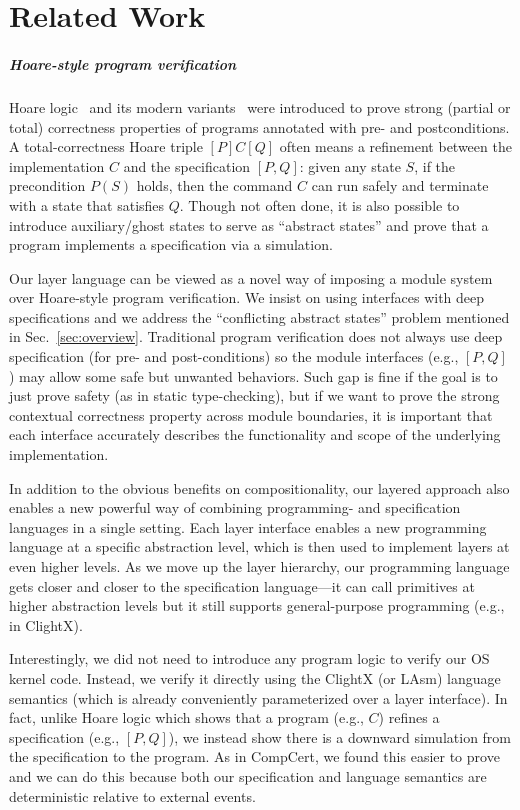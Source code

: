 
\chapter{Related Work}
\label{chap-rel}

\paragraph{Hoare-style program verification} Hoare logic~\cite{hoare69}
and its modern variants~\cite{reynolds02,boogie05,nanevski06} were
introduced to prove strong (partial or total) correctness properties
of programs annotated with pre- and postconditions. A
total-correctness Hoare triple $[P]C[Q]$ often means a refinement
between the implementation $C$ and the specification $[P,Q]$: given
any state $S$, if the precondition $P(S)$ holds, then the command $C$
can run safely and terminate with a state that satisfies $Q$. Though
not often done, it is also possible to introduce auxiliary/ghost
states to serve as ``abstract states'' and prove that a program
implements a specification via a simulation.
  
Our layer language can be viewed as a novel way of imposing a module
system over Hoare-style program verification. We insist on using
interfaces with deep specifications and we address the ``conflicting
abstract states'' problem mentioned in
Sec.~\ref{sec:overview}. Traditional program verification does not
always use deep specification (for pre- and post-conditions) so the
module interfaces (e.g., $[P,Q]$) may allow some safe but unwanted
behaviors. Such gap is fine if the goal is to just prove safety (as in
static type-checking), but if we want to prove the strong contextual
correctness property across module boundaries, it is important that
each interface accurately describes the functionality and scope of the
underlying implementation.

In addition to the obvious benefits on compositionality, our layered
approach also enables a new powerful way of combining programming- and
specification languages in a single setting. Each layer interface
enables a new programming language at a specific abstraction level,
which is then used to implement layers at even higher
levels. As we move up the layer hierarchy, our programming language
gets closer and closer to the specification language---it can call
primitives at higher abstraction levels but it still supports
general-purpose programming (e.g., in ClightX).

Interestingly, we did not need to introduce any program logic to
verify our OS kernel code. Instead, we verify it directly using the
ClightX (or LAsm) language semantics (which is already conveniently
parameterized over a layer interface).  In fact, unlike Hoare logic
which shows that a program (e.g., $C$) refines a specification (e.g.,
$[P,Q]$), we instead show there is a downward simulation from the
specification to the program. As in CompCert, we found this easier to
prove and we can do this because both our specification and language
semantics are deterministic relative to external events.

